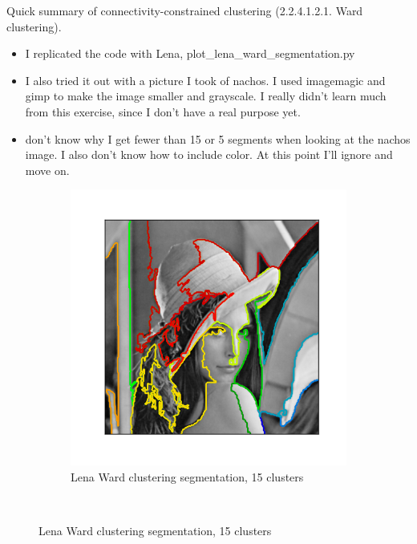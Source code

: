 \documentclass{article}
\begin{document}
	Quick summary of connectivity-constrained clustering (2.2.4.1.2.1. Ward clustering).

	\begin{itemize}
		\item I replicated the code with Lena, plot\_lena\_ward\_segmentation.py
		\item I also tried it out with a picture I took of nachos.  I used imagemagic and gimp to make the image smaller and grayscale.  I really didn't learn much from this exercise, since I don't have a real purpose yet.
		\item  don't know why I get fewer than 15 or 5 segments when looking at the nachos image. I also don't know how to include color. At this point I'll ignore and move on.
	\end{itemize}

    \begin{figure}
            \centering
            \begin{subfigure}[b]{0.3\textwidth}
                    \centering
                    \includegraphics[width=\textwidth]{lena_ward_15.png}
                    \caption{Lena Ward clustering segmentation, 15 clusters}
                    \label{fig:lena15}
            \end{subfigure}%
            ~ %

\end{figure}
\end{document}
